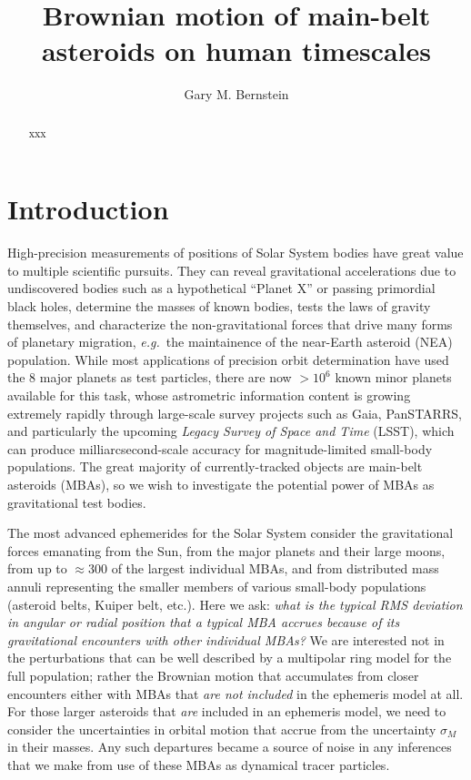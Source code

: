 \documentclass[linenumbers, onecolumn]{aastex631}
\newcommand{\eg}{\textit{e.g.\/}}
\begin{document}
\title{Brownian motion of main-belt asteroids on human timescales} 

\author[0000-0002-8613-8259]{Gary M. Bernstein}


\begin{abstract}
  xxx
\end{abstract}


\section{Introduction}

High-precision measurements of positions of Solar System bodies have
great value to multiple scientific pursuits.  They can reveal
gravitational accelerations due to undiscovered bodies such as a
hypothetical ``Planet X'' or passing primordial black holes, determine
the masses of known bodies, tests the laws of gravity themselves, and characterize 
the non-gravitational forces that drive many forms of planetary
migration, \eg\ the maintainence of the near-Earth asteroid (NEA)
population.  While most applications of precision orbit determination
have used the 8 major planets as test particles, there are now $>10^6$
known minor planets available for this task, whose astrometric
information content is growing extremely rapidly through large-scale
survey projects such as Gaia, PanSTARRS, and particularly the upcoming
\textit{Legacy Survey of Space and Time} (LSST), which can produce
milliarcsecond-scale accuracy for magnitude-limited small-body populations.  The great majority
of currently-tracked objects are main-belt asteroids (MBAs), so we
wish to investigate the potential power of MBAs as gravitational test
bodies.

The most advanced ephemerides for the Solar System consider the
gravitational forces emanating from the Sun, from the major planets and their large
moons, from up to $\approx300$ of the largest individual MBAs, and
from distributed mass annuli representing the smaller members of
various small-body populations (asteroid belts, Kuiper belt, etc.).
Here we ask: \textit{what is the typical RMS deviation in angular or radial
position that a typical MBA accrues because of its gravitational
encounters with other individual MBAs?}  We are interested not in the
perturbations that can be well described by a multipolar ring model
for the full population; rather the Brownian motion that accumulates
from closer encounters either with MBAs that \emph{are not included} in the
ephemeris model at all.  For those larger asteroids that \emph{are} included
in an ephemeris model, we need to consider the uncertainties in
orbital motion that accrue from the uncertainty $\sigma_M$ in their
masses.  Any such departures became a source of noise in any
inferences that we make from use of these MBAs as
dynamical tracer particles.  
\end{document}
